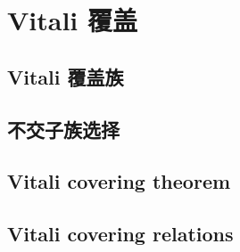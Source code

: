 \section{Vitali 覆盖}
\label{b1:sec:1301}


\subsection{Vitali 覆盖族}
\label{b1:subsec:130101}

\subsection{不交子族选择}
\label{b1:subsec:130102}

\subsection{Vitali covering theorem}
\label{b1:subsec:130103}

\subsection{Vitali covering relations}
\label{b1:subsec:130104}


